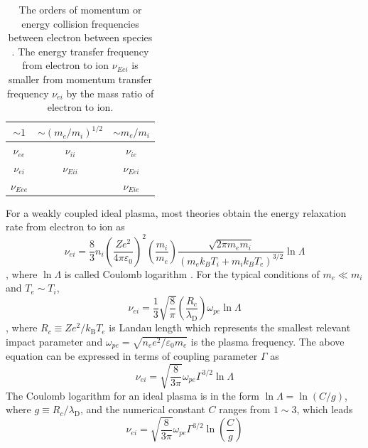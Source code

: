 \begin{table}[h!]
\footnotesize
\centering
\begin{tabular}{ccc}
\hline \hline
$\sim 1$        &   $\sim \left( m_e/m_i \right)^{1/2}$   &   $\sim m_e/m_i$   \\ \hline
$\nu_{ee}$     &   $\nu_{ii}$                                        &   $\nu_{ie}$             \\
$\nu_{ei}$      &   $\nu_{Eii}$                                      &   $\nu_{Eei}$           \\
$\nu_{Eee}$   &                                                          &   $\nu_{Eie}$            \\
\hline \hline
\end{tabular}
\caption{The orders of momentum or energy collision frequencies between electron between species \cite{bellan2008fundamentals}. The energy transfer frequency from electron to ion $\nu_{Eei}$ is smaller from momentum transfer frequency $\nu_{ei}$ by the mass ratio of electron to ion.}
\label{table:collFreq}
\end{table}

For a weakly coupled ideal plasma, most theories obtain the energy relaxation rate from electron to ion as
\begin{equation}
\nu_{ei}=\frac{8}{3} n_{i} \left( \frac{Z e^{2}}{4\pi \varepsilon_0} \right)^2 \left( \frac{m_i}{m_e} \right) \frac{\sqrt{2 \pi m_e m_i}}{\left(m_e k_{B} T_{i} + m_i k_{B} T_{e}\right)^{3 / 2}} \ln{\Lambda}
\end{equation}
, where $\ln{\Lambda}$ is called Coulomb logarithm \cite{dimonte2008molecular}. For the typical conditions of $m_e \ll m_i$ and $T_e \sim T_i$,
\begin{equation}
\nu_{ei} = \frac{1}{3} \sqrt{\frac{8}{\pi}} \left( \frac{R_c}{\lambda_\text{D}} \right) \omega_{pe} \ln{\Lambda}
\end{equation}
, where $R_c \equiv Z e^2/k_\text{B} T_e $ is Landau length which represents the smallest relevant impact parameter and $\omega_{pe} = \sqrt{n_{e} e^{2} / \varepsilon_0 m_e}$ is the plasma frequency. The above equation can be expressed in terms of coupling parameter $\Gamma$ as
\begin{equation}
\nu_{ei} = \sqrt{\frac{8}{3\pi}} \omega_{pe} \Gamma^{3/2} \ln{\Lambda}
\end{equation}
The Coulomb logarithm for an ideal plasma is in the form $\ln{\Lambda} = \ln{\left( C/g \right)}$, where $g \equiv R_c/\lambda_\text{D}$, and the numerical constant $C$ ranges from $1 \sim 3$, which leads
\begin{equation}
\nu_{ei} = \sqrt{\frac{8}{3\pi}} \omega_{pe} \Gamma^{3/2} \ln{\left( \frac{C}{g} \right)}
\end{equation}

